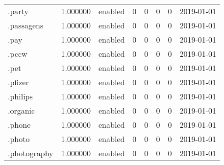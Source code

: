 \begin{tabular}{lrlrrrrl}
.party                    &          1.000000 &         enabled &                           0 &                           0 &                           0 &                   0 &           2019-01-01 \\
.passagens                &          1.000000 &         enabled &                           0 &                           0 &                           0 &                   0 &           2019-01-01 \\
.pay                      &          1.000000 &         enabled &                           0 &                           0 &                           0 &                   0 &           2019-01-01 \\
.pccw                     &          1.000000 &         enabled &                           0 &                           0 &                           0 &                   0 &           2019-01-01 \\
.pet                      &          1.000000 &         enabled &                           0 &                           0 &                           0 &                   0 &           2019-01-01 \\
.pfizer                   &          1.000000 &         enabled &                           0 &                           0 &                           0 &                   0 &           2019-01-01 \\
.philips                  &          1.000000 &         enabled &                           0 &                           0 &                           0 &                   0 &           2019-01-01 \\
.organic                  &          1.000000 &         enabled &                           0 &                           0 &                           0 &                   0 &           2019-01-01 \\
.phone                    &          1.000000 &         enabled &                           0 &                           0 &                           0 &                   0 &           2019-01-01 \\
.photo                    &          1.000000 &         enabled &                           0 &                           0 &                           0 &                   0 &           2019-01-01 \\
.photography              &          1.000000 &         enabled &                           0 &                           0 &                           0 &                   0 &           2019-01-01 \\

\end{tabular}
